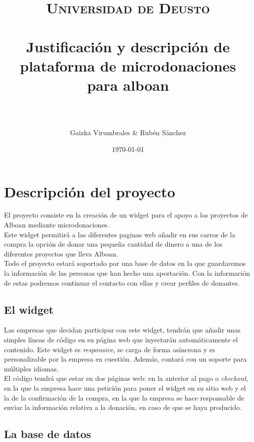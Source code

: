 \documentclass[paper=a4, fontsize=12pt]{scrartcl} %
\title{	
\normalfont \normalsize 
\textsc{Universidad de Deusto} \\ [25pt] %
\horrule{0.5pt} \\[0.4cm] %
\huge Justificación y descripción de plataforma de microdonaciones para alboan\\ %
\horrule{2pt} \\[0.5cm] %
\author{Gaizka Virumbrales \& Rubén Sánchez} %
}
\date{\normalsize\today} %
\numberwithin{equation}{section} %
\numberwithin{figure}{section} %
\numberwithin{table}{section} %
\begin{document}
\maketitle %


\section{Descripción del proyecto}

El proyecto consiste en la creación de un widget para el apoyo a los proyectos de Alboan mediante microdonaciones.\\
Este widget permitirá a las diferentes paginas web añadir en sus carros de la compra la opción de donar una pequeña cantidad de dinero a una de los diferentes proyectos que lleva Alboan.\\
Todo el proyecto estará soportado por una base de datos en la que guardaremos la información de las personas que han hecho una aportación. Con la información de estas podremos continuar el contacto con ellas y crear perfiles de donantes.


\subsection{El widget}
Las empresas que decidan participar con este widget, tendrán que añadir unas simples líneas de código en su página web que inyectarán automáticamente el contenido. Este widget es \textit{responsive}, se carga de forma asíncrona y es personalizable por la empresa en cuestión. Además, contará con un soporte para múltiples idiomas.\\
El código tendrá que estar en dos páginas web: en la anterior al pago o \textit{checkout}, en la que la empresa hace una petición para poner el widget en su sitio web y el la de la confirmación de la compra, en la que la empresa se hace responsable de enviar la información relativa a la donación, en caso de que se haya producido.


\subsection{La base de datos}
\end{document}
